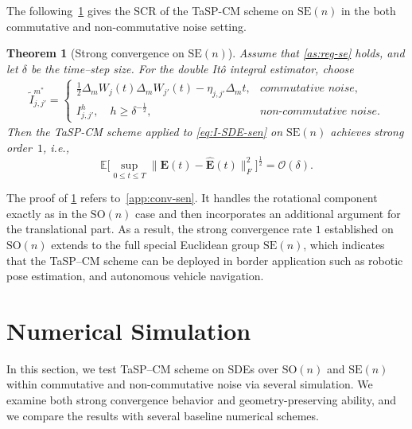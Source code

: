 \documentclass[11pt, a4paper, onecolumn]{article}
\newcommand{\SOn}{\mathrm{SO}(n)}
\newcommand{\SEn}{\mathrm{SE}(n)}
\newcommand{\E}{\mathbb{E}}
\newcommand{\bfE}{\bf{E}}
\newcommand{\hatE}{\widehat{\bf E}}
\renewcommand{\bf}[1]{\mathbf{#1}}
\newcommand{\calO}{\mathcal{O}}
\newcommand{\ms}{{m^*}}
\newcommand{\tIjjpms}{ { \tilde I_{j,j'}^{\ms}} }
\newcommand{\half}{{\frac{1}{2}}}
\newcommand{\thalf}{{\tfrac{1}{2}}}
\newtheorem{theorem}{Theorem}
\begin{document}
The following~\cref{thm:convergence-sen} gives the SCR of the TaSP-CM scheme on $\SEn$ in the both commutative and non-commutative noise setting.

\begin{theorem}[Strong convergence on $\SEn$]\label{thm:convergence-sen}
Assume that \cref{as:reg-se} holds, and let $\delta$ be the time–step size.  
For the double It\^o integral estimator, choose
\begin{align*}
    \tIjjpms =
    \begin{cases}
        \tfrac12\Delta_{m} W_{j}(t)\Delta_{m} W_{j'}(t) - \eta_{j,j'}\Delta_{m}t, & \textit{commutative noise},\\[6pt]
        I_{j,j'}^{h}, \quad h \ge \delta^{-\thalf}, & \textit{non-commutative noise}.
    \end{cases}
\end{align*}
Then the TaSP-CM scheme applied to \eqref{eq:I-SDE-sen} on $\SEn$ achieves strong order~$1$, i.e.,
\[
    \E\bigl[\sup_{0 \le t \le T} \|\bfE(t) - \hatE(t)\|_F^{2}\bigr]^{\half} = \calO(\delta).
\]
\end{theorem}

The proof of \cref{thm:convergence-sen} refers to~\cref{app:conv-sen}. It handles the rotational component exactly as in the $\SOn$ case and then incorporates an additional argument for the translational part. As a result, the strong convergence rate $1$ established on $\SOn$ extends to the full special Euclidean group $\SEn$, which indicates that the TaSP–CM scheme can be deployed in border application such as robotic pose estimation, and autonomous vehicle navigation.

\section{Numerical Simulation}\label{sec:experiments}

In this section, we test TaSP–CM scheme on SDEs over $\mathrm{SO}(n)$ and $\SEn$ within commutative and non-commutative noise via several simulation.   We examine both strong convergence behavior and geometry-preserving ability, and we compare the results with several baseline numerical schemes.
\end{document}
